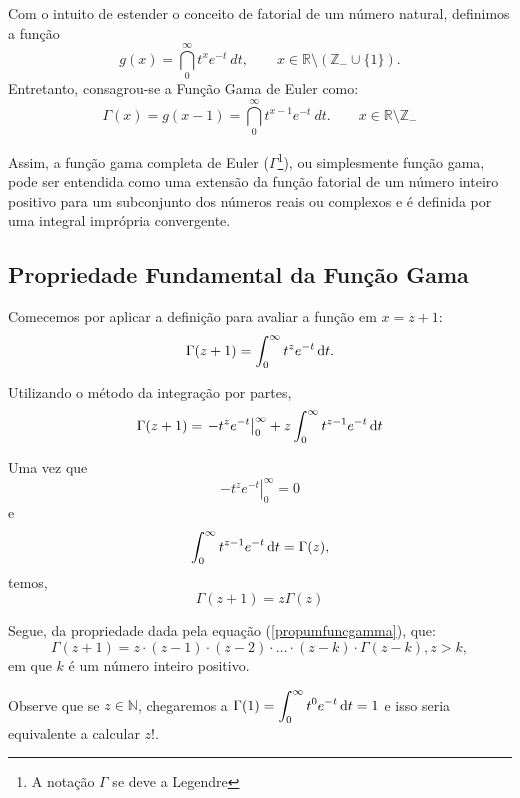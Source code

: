 Com o intuito de estender o conceito de fatorial de um número natural, definimos a função
\begin{equation}
g(x) = \dint_{0}^{\infty} t^{x} e^{-t} \ dt, \qquad x \in \mathbb{R} \setminus (\mathbb{Z}_{-} \cup \{1\}).
\end{equation}
Entretanto, consagrou-se a Função Gama de Euler como:
\begin{equation}
\Gamma(x) = g(x-1) = \dint_{0}^{\infty} t^{x-1} e^{-t} \ dt. \qquad x \in \mathbb{R} \setminus \mathbb{Z}_{-}
\end{equation}


Assim, a função gama completa de Euler ($\Gamma$\footnote{A notação $\Gamma$ se deve a Legendre}), ou simplesmente função gama, pode ser entendida como uma extensão da função fatorial de um número inteiro positivo para um subconjunto dos números reais ou complexos e é definida por uma integral imprópria convergente.



\subsection*{Propriedade Fundamental da Função Gama}

Comecemos por aplicar a definição para avaliar a função em $x = z+1$:
\begin{equation}
\Gamma(z+1)= \displaystyle \int_{0}^{\infty} t^{z} e^{-t} \operatorname{d}\!t.
\end{equation}

Utilizando o método da integração por partes,
\begin{equation}
\Gamma(z+1)
= \left.- t^{z} e^{-t}\right\vert_{0}^{\infty}+z\displaystyle \int_{0}^{\infty}t^{z-1}e^{-t}\operatorname{d}\!t
\end{equation}

Uma vez que 
$$\left.-t^{z}e^{-t}\right\vert_{0}^{\infty}=0$$
e
$$\displaystyle \int_{0}^{\infty}t^{z-1}e^{-t}\operatorname{d}\!t = \Gamma(z),$$
temos,
\begin{equation}\label{propumfuncgamma}
\Gamma(z+1)=z\Gamma(z)
\end{equation}

Segue, da propriedade dada pela equação (\ref{propumfuncgamma}), que:
$$\Gamma(z+1)=z \cdot (z-1) \cdot (z-2) \cdot \ldots \cdot (z-k) \cdot \Gamma(z-k), z > k,$$
em que $k$ é um número inteiro positivo.

Observe que se $z \in \mathbb{N}$, chegaremos a $\Gamma(1) = \displaystyle \int_{0}^{\infty} t^{0} e^{-t}\operatorname{d}\!t = 1$ e isso seria equivalente a calcular $z!$.

